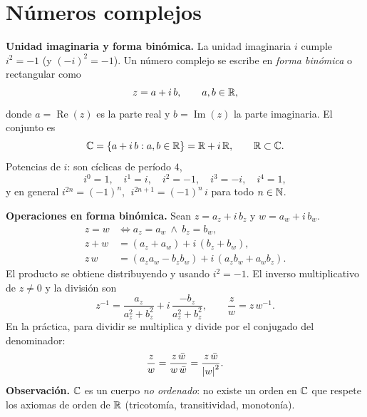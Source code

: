 \section{Números complejos}

\begin{teoria}
\textbf{Unidad imaginaria y forma binómica.}
La unidad imaginaria $i$ cumple $i^2 = -1$ (y $(-i)^2 = -1$). Un número complejo se escribe en \emph{forma binómica} o rectangular como
\[
z = a + i\,b, \qquad a,b \in \mathbb{R},
\]
donde $a = \operatorname{Re}(z)$ es la parte real y $b = \operatorname{Im}(z)$ la parte imaginaria. El conjunto es
\[
\mathbb{C} = \{ a + i\,b : a,b \in \mathbb{R} \} = \mathbb{R} + i\,\mathbb{R}, \qquad \mathbb{R} \subset \mathbb{C}.
\]
Potencias de $i$: son cíclicas de período $4$,
\[
i^0 = 1, \quad i^1 = i, \quad i^2 = -1, \quad i^3 = -i, \quad i^4 = 1,
\]
y en general $i^{2n} = (-1)^n$, $\; i^{2n+1} = (-1)^n\, i$ para todo $n \in \mathbb{N}$.
\end{teoria}

\begin{teoria}
\textbf{Operaciones en forma binómica.} Sean $z = a_z + i\,b_z$ y $w = a_w + i\,b_w$.
\begin{align*}
z = w &\iff a_z = a_w \ \wedge\ b_z = b_w, \\
z + w &= (a_z + a_w) + i\,(b_z + b_w), \\
z\,w &= (a_z a_w - b_z b_w) + i\,(a_z b_w + a_w b_z).
\end{align*}
El producto se obtiene distribuyendo y usando $i^2 = -1$. El inverso multiplicativo de $z \neq 0$ y la división son
\[
z^{-1} = \frac{a_z}{a_z^2 + b_z^2} + i\,\frac{-b_z}{a_z^2 + b_z^2}, \qquad
\frac{z}{w} = z\,w^{-1}.
\]
En la práctica, para dividir se multiplica y divide por el conjugado del denominador:
\[
\frac{z}{w} = \frac{z\,\bar w}{w\,\bar w} = \frac{z\,\bar w}{\left\lvert w \right\rvert^2}.
\]
\textbf{Observación.} $\mathbb{C}$ es un cuerpo \emph{no ordenado}: no existe un orden en $\mathbb{C}$ que respete los axiomas de orden de $\mathbb{R}$ (tricotomía, transitividad, monotonía).
\end{teoria}

